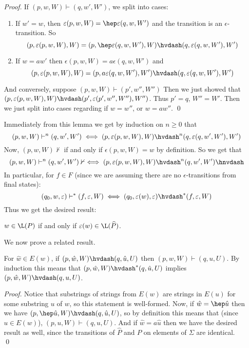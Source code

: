 \documentclass{llncs}
\begin{document}
\begin{proof}

    If $(p,w,W)\vdash(q,w',W')$, we split into cases:
    \begin{enumerate}
        \item If $w'=w$, then $\epsilon(p,w,W)=\hep\epsilon(q,w,W')$ and the transition is an $\epsilon$-transition.
         So
         $$ (p,\epsilon(p,w,W),W) = (p,\hep\epsilon(q,w,W'),W) \hvdash (q,\epsilon(q,w,W'),W') $$
        \item If $w=aw'$ then $\epsilon(p,w,W)=a\epsilon(q,w,W')$ and
        $$ (p,\epsilon(p,w,W),W)=(p,a\epsilon(q,w,W'),W') \hvdash (q,\epsilon(q,w,W'),W') $$
    \end{enumerate}

    And conversely, suppose $(p,w,W)\vdash(p',w'',W'')$
    Then we just showed that $(p,\epsilon(p,w,W),W)\hvdash(p',\epsilon(p',w'',W''),W'')$.
    Thus $p'=q$, $W''=W'$.
    Then we just split into cases regarding if $w=w''$, or $w=aw''$.
    \qed

\end{proof}

Immediately from this lemma we get by induction on $n\geq0$ that
$$ (p,w,W)\vdash^n(q,w',W') \iff (p,\epsilon(p,w,W),W)\hvdash^n(q,\epsilon(q,w',W'),W') $$
Now, $(p,w,W)\nvdash$ if and only if $\epsilon(p,w,W)=w$ by definition.
So we get that
$$ (p,w,W)\vdash^n(q,w',W')\nvdash \iff (p,\epsilon(p,w,W),W)\hvdash^n(q,w',W')\hnvdash $$
In particular, for $f\in F$ (since we are assuming there are no $\epsilon$-transitions from final states):
$$ (q_0,w,\epsilon)\vdash^*(f,\epsilon,W) \iff (q_0,\epsilon(w),\epsilon) \hvdash^* (f,\epsilon,W) $$
Thus we get the desired result:

\begin{theorem}

    $w\in\L(P)$ if and only if $\epsilon(w)\in\L(\widehat P)$.

\end{theorem}

We now prove a related result.

\begin{lemma}

    For $\hat w\in E(w)$, if $(p,\hat w,W)\hvdash(q,\hat u,U)$ then $(p,w,W)\vdash(q,u,U)$.
    By induction this means that $(p,\hat w,W)\hvdash^*(q,\hat u,U)$ implies $(p,\hat w,W)\hvdash(q,u,U)$.

\end{lemma}

\begin{proof}

    Notice that substrings of strings from $E(w)$ are strings in $E(u)$ for some substring $u$ of $w$, so this statement is well-formed.
    Now, if $\hat w=\hep\hat u$ then we have $(p,\hep\hat u,W)\hvdash(q,\hat u,U)$, so by definition this means that (since $\hat u\in E(w)$), $(p,u,W)\vdash(q,u,U)$.
    And if $\hat w=a\hat u$ then we have the desired result as well, since the transitions of $\widehat P$ and $P$ on elements of $\Sigma$ are identical.
    \qed

\end{proof}
\end{document}
